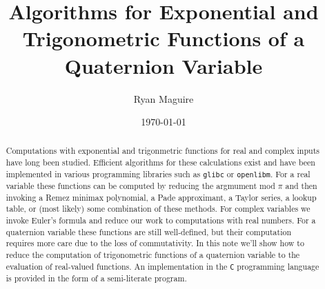 \documentclass{article}
\title{Algorithms for Exponential and Trigonometric Functions of a Quaternion Variable}
\author{Ryan Maguire}
\date{\today}
\theoremstyle{plain}
\theoremstyle{normal}
\begin{document}
    \maketitle
    \begin{abstract}
        Computations with exponential and trigonmetric
        functions for real and complex inputs
        have long been studied. Efficient algorithms for these calculations
        exist and have been implemented in various programming libraries such
        as \texttt{glibc} or \texttt{openlibm}.
        For a real variable these functions can be computed by reducing the
        argmument mod $\pi$ and then invoking a Remez minimax polynomial, a
        Pade approximant, a Taylor series, a lookup table, or (most likely)
        some combination of these methods. For complex variables we invoke
        Euler's formula and reduce our work to computations with real numbers.
        For a quaternion variable these functions are still well-defined, but
        their computation requires more care due to the loss of commutativity.
        In this note we'll show how to reduce the computation of trigonometric
        functions of a quaternion variable to the evaluation of real-valued
        functions. An implementation in the \texttt{C} programming language is
        provided in the form of a semi-literate program.
    \end{abstract}
    \tableofcontents
\end{document}
